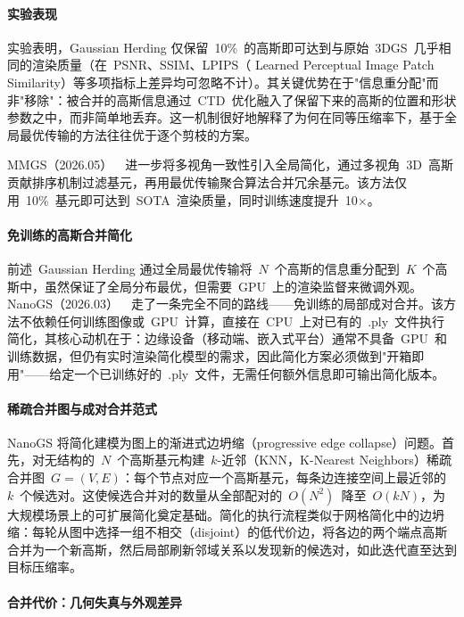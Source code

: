 \paragraph{实验表现}

实验表明，Gaussian Herding 仅保留~10\%~的高斯即可达到与原始~3DGS~几乎相同的渲染质量（在~PSNR、SSIM、LPIPS（ Learned Perceptual Image Patch Similarity）等多项指标上差异均可忽略不计）。其关键优势在于"信息重分配"而非"移除"：被合并的高斯信息通过~CTD~优化融入了保留下来的高斯的位置和形状参数之中，而非简单地丢弃。这一机制很好地解释了为何在同等压缩率下，基于全局最优传输的方法往往优于逐个剪枝的方案。

MMGS（2026.05）~\cite{2605_19304}~进一步将多视角一致性引入全局简化，通过多视角~3D~高斯贡献排序机制过滤基元，再用最优传输聚合算法合并冗余基元。该方法仅用~10\%~基元即可达到~SOTA~渲染质量，同时训练速度提升~10$\times$。

\paragraph{免训练的高斯合并简化}

前述~Gaussian Herding 通过全局最优传输将~$N$~个高斯的信息重分配到~$K$~个高斯中，虽然保证了全局分布最优，但需要~GPU~上的渲染监督来微调外观。NanoGS（2026.03）~\cite{2603_16103}~走了一条完全不同的路线——免训练的局部成对合并。该方法不依赖任何训练图像或~GPU~计算，直接在~CPU~上对已有的~.ply~文件执行简化，其核心动机在于：边缘设备（移动端、嵌入式平台）通常不具备~GPU~和训练数据，但仍有实时渲染简化模型的需求，因此简化方案必须做到"开箱即用"——给定一个已训练好的~.ply~文件，无需任何额外信息即可输出简化版本。

\paragraph{稀疏合并图与成对合并范式}

NanoGS 将简化建模为图上的渐进式边坍缩（progressive edge collapse）问题。首先，对无结构的~$N$~个高斯基元构建~$k$-近邻（KNN，K-Nearest Neighbors）稀疏合并图~$G = (V, E)$：每个节点对应一个高斯基元，每条边连接空间上最近邻的~$k$~个候选对。这使候选合并对的数量从全部配对的~$O(N^2)$~降至~$O(kN)$，为大规模场景上的可扩展简化奠定基础。简化的执行流程类似于网格简化中的边坍缩：每轮从图中选择一组不相交（disjoint）的低代价边，将各边的两个端点高斯合并为一个新高斯，然后局部刷新邻域关系以发现新的候选对，如此迭代直至达到目标压缩率。

\paragraph{合并代价：几何失真与外观差异}

